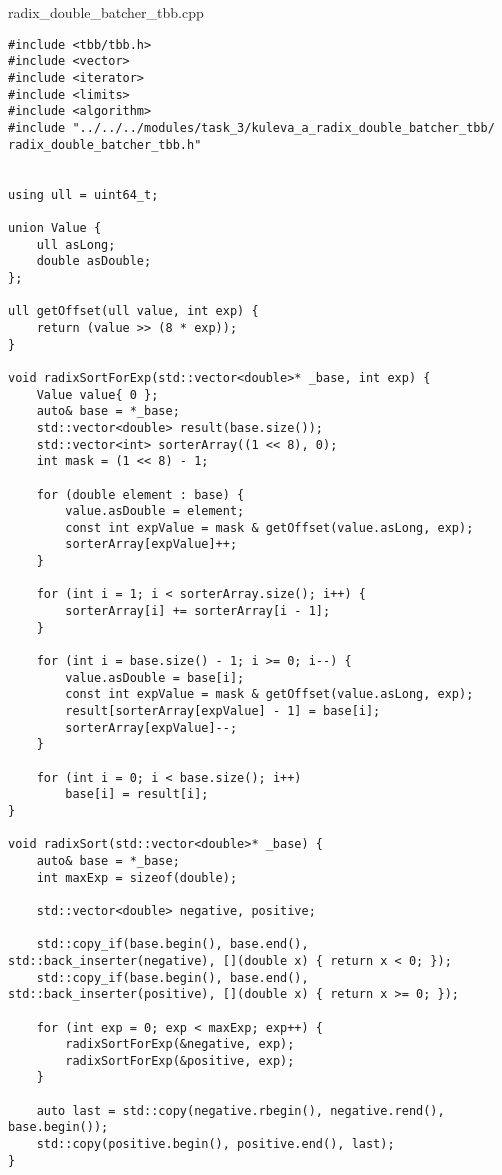 \documentclass[12pt,a4paper]{article}
\begin{document}
\section{} radix\_double\_batcher\_tbb.cpp
\begin{lstlisting}
#include <tbb/tbb.h>
#include <vector>
#include <iterator>
#include <limits>
#include <algorithm>
#include "../../../modules/task_3/kuleva_a_radix_double_batcher_tbb/ radix_double_batcher_tbb.h"


using ull = uint64_t;

union Value {
    ull asLong;
    double asDouble;
};

ull getOffset(ull value, int exp) {
    return (value >> (8 * exp));
}

void radixSortForExp(std::vector<double>* _base, int exp) {
    Value value{ 0 };
    auto& base = *_base;
    std::vector<double> result(base.size());
    std::vector<int> sorterArray((1 << 8), 0);
    int mask = (1 << 8) - 1;

    for (double element : base) {
        value.asDouble = element;
        const int expValue = mask & getOffset(value.asLong, exp);
        sorterArray[expValue]++;
    }

    for (int i = 1; i < sorterArray.size(); i++) {
        sorterArray[i] += sorterArray[i - 1];
    }

    for (int i = base.size() - 1; i >= 0; i--) {
        value.asDouble = base[i];
        const int expValue = mask & getOffset(value.asLong, exp);
        result[sorterArray[expValue] - 1] = base[i];
        sorterArray[expValue]--;
    }

    for (int i = 0; i < base.size(); i++)
        base[i] = result[i];
}

void radixSort(std::vector<double>* _base) {
    auto& base = *_base;
    int maxExp = sizeof(double);

    std::vector<double> negative, positive;

    std::copy_if(base.begin(), base.end(), std::back_inserter(negative), [](double x) { return x < 0; });
    std::copy_if(base.begin(), base.end(), std::back_inserter(positive), [](double x) { return x >= 0; });

    for (int exp = 0; exp < maxExp; exp++) {
        radixSortForExp(&negative, exp);
        radixSortForExp(&positive, exp);
    }

    auto last = std::copy(negative.rbegin(), negative.rend(), base.begin());
    std::copy(positive.begin(), positive.end(), last);
}


\end{lstlisting}
\end{document}
